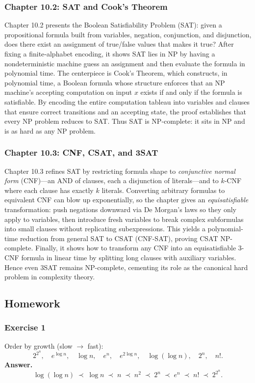 \documentclass{article}
\theoremstyle{theorem}
\theoremstyle{definition}
\theoremstyle{remark}
\begin{document}
\subsubsection*{Chapter 10.2: SAT and Cook’s Theorem}
Chapter 10.2 presents the Boolean Satisfiability Problem (SAT): given a propositional formula built from variables, negation, conjunction, and disjunction, does there exist an assignment of true/false values that makes it true? After fixing a finite‐alphabet encoding, it shows SAT lies in NP by having a nondeterministic machine guess an assignment and then evaluate the formula in polynomial time. The centerpiece is Cook’s Theorem, which constructs, in polynomial time, a Boolean formula whose structure enforces that an NP machine’s accepting computation on input \(x\) exists if and only if the formula is satisfiable. By encoding the entire computation tableau into variables and clauses that ensure correct transitions and an accepting state, the proof establishes that every NP problem reduces to SAT. Thus SAT is NP-complete: it sits in NP and is as hard as any NP problem.

\subsubsection*{Chapter 10.3: CNF, CSAT, and 3SAT}
Chapter 10.3 refines SAT by restricting formula shape to \emph{conjunctive normal form} (CNF)—an AND of clauses, each a disjunction of literals—and to \(k\)-CNF where each clause has exactly \(k\) literals. Converting arbitrary formulas to equivalent CNF can blow up exponentially, so the chapter gives an \emph{equisatisfiable} transformation: push negations downward via De Morgan’s laws so they only apply to variables, then introduce fresh variables to break complex subformulas into small clauses without replicating subexpressions. This yields a polynomial-time reduction from general SAT to CSAT (CNF-SAT), proving CSAT NP-complete. Finally, it shows how to transform any CNF into an equisatisfiable 3-CNF formula in linear time by splitting long clauses with auxiliary variables. Hence even 3SAT remains NP-complete, cementing its role as the canonical hard problem in complexity theory.

\subsection{Homework}
\subsubsection*{Exercise 1}
Order by growth (slow \(\to\) fast):
\[
2^{2^n},\quad e^{\log n},\quad \log n,\quad e^n,\quad
e^{2\log n},\quad \log(\log n),\quad 2^n,\quad n!.
\]
\textbf{Answer.}
\[
\log(\log n)\;\prec\;\log n\;\prec\;n\;\prec\;n^2\;\prec\;2^n\;\prec\;e^n\;\prec\;n!\;\prec\;2^{2^n}.
\]
\end{document}
